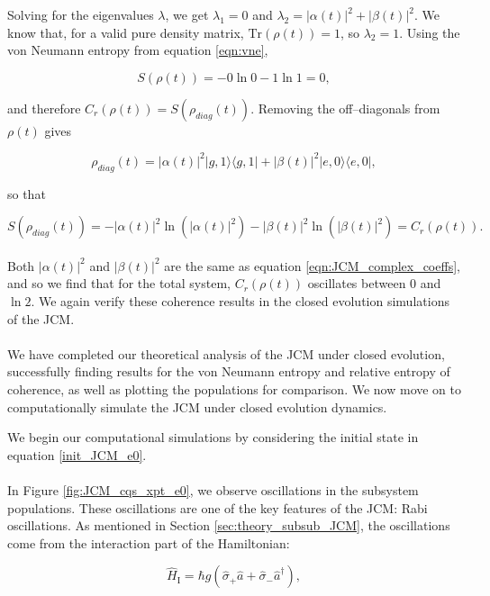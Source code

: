 \documentclass[11pt]{article}
\begin{document}
Solving for the eigenvalues $\lambda$, we get $\lambda_1 = 0$ and $\lambda_2 = |\alpha(t)|^2 + |\beta(t)|^2$. We know that, for a valid pure density matrix, $\text{Tr}(\rho(t)) = 1$, so $\lambda_2 = 1$. Using the von Neumann entropy from equation \eqref{eqn:vne},

\begin{equation*}
    S(\rho(t)) = - 0 \ln0 - 1\ln1 = 0, 
\end{equation*}

and therefore $C_r(\rho(t)) = S(\rho_{diag}(t))$. Removing the off--diagonals from $\rho(t)$ gives

\begin{equation*}
    \rho_{diag}(t) = |\alpha(t)|^2|g,1\rangle\langle g,1| + |\beta(t)|^2|e,0\rangle\langle e,0|,
\end{equation*}

so that

\begin{equation*}
    S(\rho_{diag}(t)) = - |\alpha(t)|^2\ln(|\alpha(t)|^2) - |\beta(t)|^2\ln(|\beta(t)|^2) = C_r(\rho(t)).
\end{equation*}
\\
Both $|\alpha(t)|^2$ and $|\beta(t)|^2$ are the same as equation \eqref{eqn:JCM_complex_coeffs}, and so we find that for the total system, $C_r(\rho(t))$
oscillates between $0$ and $\ln2$. We again verify these coherence results in the closed evolution simulations of the JCM.\\
\\
We have completed our theoretical analysis of the JCM under closed evolution, successfully finding results for the von Neumann entropy and relative entropy of coherence, as well as plotting the populations for comparison. We now move on to computationally simulate the JCM under closed evolution dynamics. 

We begin our computational simulations by considering the initial state in equation \ref{init_JCM_e0}.\\
\\
In Figure \ref{fig:JCM_cqs_xpt_e0}, we observe oscillations in the subsystem populations. These oscillations are one of the key features of the JCM: Rabi oscillations. As mentioned in Section \ref{sec:theory_subsub_JCM}, the oscillations come from the interaction part of the Hamiltonian:

\begin{equation*}
     \hat{H}_{\scriptscriptstyle \text{I}} = \hbar g(\hat{\sigma}_{+}\hat{a} +\hat{\sigma}_{-}\hat{a}^\dagger),
\end{equation*}
\end{document}
